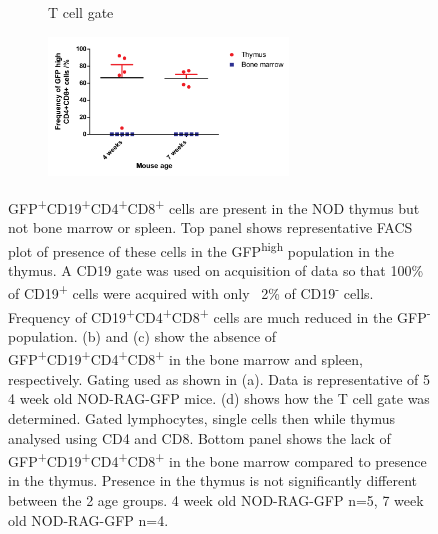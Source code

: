 \begin{figure}
\begin{subfigure}{0.3\textwidth}
	\caption{T cell gate}
	\label{subfig:Tcellgate}
	\end{subfigure}
	\begin{subfigure}{\textwidth}
	\centering
	\includegraphics[width=0.7\textwidth]{Figures/RAGCD19CD4CD8ThyBM.pdf}
	\caption{}
	\label{BMvThyDPgraph}
	\end{subfigure}
\caption[There are GFP\textsuperscript{+}CD19\textsuperscript{+}CD4\textsuperscript{+}CD8\textsuperscript{+} cells present in the NOD thymus] {GFP\textsuperscript{+}CD19\textsuperscript{+}CD4\textsuperscript{+}CD8\textsuperscript{+} cells are present in the NOD thymus but not bone marrow or spleen.
Top panel shows representative FACS plot of presence of these cells in the GFP\textsuperscript{high} population in the thymus. A CD19 gate was used on acquisition of data so that 100\% of CD19\textsuperscript{+} cells were acquired with only ~2\% of CD19\textsuperscript{-} cells.
Frequency of CD19\textsuperscript{+}CD4\textsuperscript{+}CD8\textsuperscript{+} cells are much reduced in the GFP\textsuperscript{-} population.
(b) and (c) show the absence of GFP\textsuperscript{+}CD19\textsuperscript{+}CD4\textsuperscript{+}CD8\textsuperscript{+} in the bone marrow and spleen, respectively. Gating used as shown in (a). Data is representative of 5 4 week old NOD-RAG-GFP mice.
(d) shows how the T cell gate was determined. Gated lymphocytes, single cells then while thymus analysed using CD4 and CD8.
Bottom panel shows the lack of GFP\textsuperscript{+}CD19\textsuperscript{+}CD4\textsuperscript{+}CD8\textsuperscript{+} in the bone marrow compared to presence in the thymus. Presence in the thymus is not significantly different between the 2 age groups.
4 week old NOD-RAG-GFP n=5, 7 week old NOD-RAG-GFP n=4.}
\label{fig:RAGCD19DP}
\end{figure}




